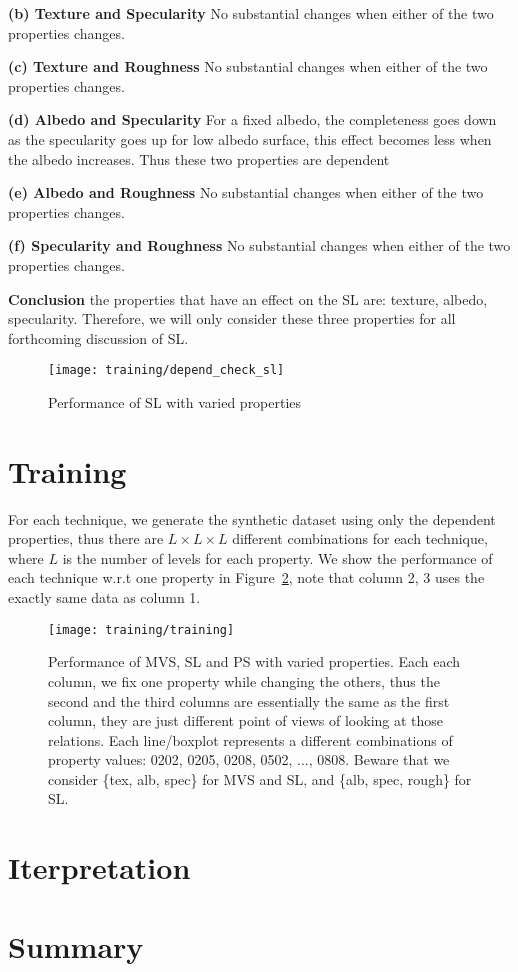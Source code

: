 \textbf{(b) Texture and Specularity} 
No substantial changes when either of the two properties changes.

\textbf{(c) Texture and Roughness} 
No substantial changes when either of the two properties changes.

\textbf{(d) Albedo and Specularity} 
For a fixed albedo, the completeness goes down as the specularity goes up for low albedo surface, this effect becomes less when the albedo increases. Thus these two properties are dependent

\textbf{(e) Albedo and Roughness} 
No substantial changes when either of the two properties changes.

\textbf{(f) Specularity and Roughness} 
No substantial changes when either of the two properties changes.

\textbf{Conclusion} the properties that have an effect on the SL are: texture, albedo, specularity. Therefore, we will only consider these three properties for all forthcoming discussion of SL.

\begin{figure}[h!]
\texttt{[image: training/depend\_check\_sl]}
\caption{Performance of SL with varied properties}
\label{fig:depend_check_sl}
\end{figure}

\section{Training}
For each technique, we generate the synthetic dataset using only the dependent properties, thus there are $L\times L\times L$ different combinations for each technique, where $L$ is the number of levels for each property. We show the performance of each technique w.r.t one property in Figure~\ref{fig:training}, note that column 2, 3 uses the exactly same data as column 1.

\begin{figure}[h!]
\texttt{[image: training/training]}
\caption{Performance of MVS, SL and PS with varied properties. Each each column, we fix one property while changing the others, thus the second and the third columns are essentially the same as the first column, they are just different point of views of looking at those relations. Each line/boxplot represents a different combinations of property values: 0202, 0205, 0208, 0502, ..., 0808. Beware that we consider \{tex, alb, spec\} for MVS and SL, and \{alb, spec, rough\} for SL.}
\label{fig:training}
\end{figure}

\section{Iterpretation}

\section{Summary}

